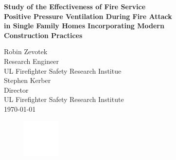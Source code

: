 \documentclass{article}
\begin{document}
	\begin{titlepage}
		
		\pagecolor{ULred}\afterpage{\nopagecolor}
		


			\vspace*{23\baselineskip} 

		\huge
		\begin{adjustwidth}{-0.5in}{-0in}
		\color{white}
		\textbf{Study of the Effectiveness of Fire Service \\ Positive Pressure Ventilation During Fire Attack \\ in Single Family Homes Incorporating Modern \\ Construction Practices\\}
		\end{adjustwidth}
		\begin{adjustwidth}{-0.5in}{}
		\color{white}
		\vspace{.2in}
		\large
		Robin Zevotek \\
		Research Engineer \\
		UL Firefighter Safety Research Institue \\
		\vspace*{\baselineskip}
		Stephen Kerber\\
		Director \\
		UL Firefighter Safety Research Institute \\ 
		\vspace*{\baselineskip}
		\today
		\vspace*{\baselineskip}
		\vspace{.2in}
		\begin{figure}[h]
			\hspace*{-0.5in}\includegraphics[width=0.75in]{0_Images/Section_1/ULLogoWhite.pdf}
		\end{figure}
		\end{adjustwidth}
	\end{titlepage}
\end{document}

